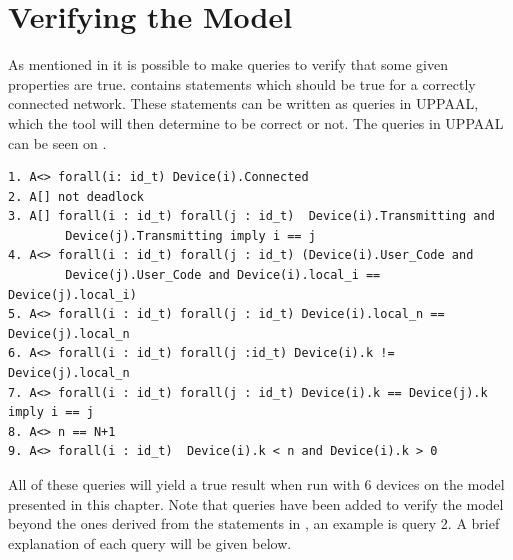\section{Verifying the Model}

As mentioned in  it is possible to make queries to verify that some given properties are true.
 contains statements which should be true for a correctly connected network.
These statements can be written as queries in UPPAAL, which the tool will then determine to be correct or not. 
The queries in UPPAAL can be seen on .

\begin{lstlisting}[language={[GUI]Uppaal}, % use GUI flavor
columns={[l]flexible},
frameround=fftt, frame=shadowbox, rulesepcolor=\color{gray},label=lst:UPPAAL_Queries,
caption={Queries for the UPPAAL Model}]
1. A<> forall(i: id_t) Device(i).Connected
2. A[] not deadlock
3. A[] forall(i : id_t) forall(j : id_t)  Device(i).Transmitting and 
		Device(j).Transmitting imply i == j
4. A<> forall(i : id_t) forall(j : id_t) (Device(i).User_Code and 
		Device(j).User_Code and Device(i).local_i == Device(j).local_i)
5. A<> forall(i : id_t) forall(j : id_t) Device(i).local_n == Device(j).local_n
6. A<> forall(i : id_t) forall(j :id_t) Device(i).k != Device(j).local_n
7. A<> forall(i : id_t) forall(j : id_t) Device(i).k == Device(j).k imply i == j
8. A<> n == N+1
9. A<> forall(i : id_t)  Device(i).k < n and Device(i).k > 0
\end{lstlisting}

All of these queries will yield a true result when run with 6 devices on the model presented in this chapter.
Note that queries have been added to verify the model beyond the ones derived from the statements in , an example is query 2.
A brief explanation of each query will be given below. 

